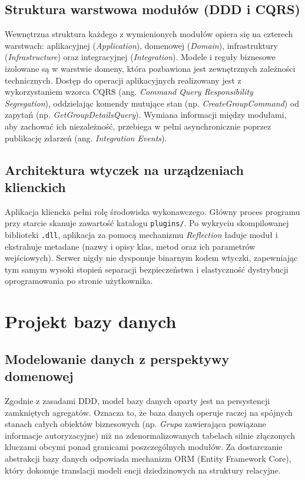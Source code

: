\subsection{Struktura warstwowa modułów (DDD i CQRS)}
\label{subsec:ddd_cqrs}
Wewnętrzna struktura każdego z wymienionych modułów opiera się na czterech warstwach: aplikacyjnej (\textit{Application}), domenowej (\textit{Domain}), infrastruktury (\textit{Infrastructure}) oraz integracyjnej (\textit{Integration}). Modele i reguły biznesowe izolowane są w warstwie domeny, która pozbawiona jest zewnętrznych zależności technicznych. Dostęp do operacji aplikacyjnych realizowany jest z wykorzystaniem wzorca CQRS (ang. \textit{Command Query Responsibility Segregation}), oddzielając komendy mutujące stan (np. \textit{CreateGroupCommand}) od zapytań (np. \textit{GetGroupDetailsQuery}). Wymiana informacji między modułami, aby zachować ich niezależność, przebiega w pełni asynchronicznie poprzez publikację zdarzeń (ang. \textit{Integration Events}).

\subsection{Architektura wtyczek na urządzeniach klienckich}
\label{subsec:architektura_wtyczek}
Aplikacja kliencka pełni rolę środowiska wykonawczego. Główny proces programu przy starcie skanuje zawartość katalogu \texttt{plugins/}. Po wykryciu skompilowanej biblioteki \texttt{.dll}, aplikacja za pomocą mechanizmu \textit{Reflection} ładuje moduł i ekstrahuje metadane (nazwy i opisy klas, metod oraz ich parametrów wejściowych). Serwer nigdy nie dysponuje binarnym kodem wtyczki, zapewniając tym samym wysoki stopień separacji bezpieczeństwa i elastyczność dystrybucji oprogramowania po stronie użytkownika.

\section{Projekt bazy danych}
\label{sec:baza_danych}

\subsection{Modelowanie danych z perspektywy domenowej}
\label{subsec:modelowanie_domenowe}
Zgodnie z zasadami DDD, model bazy danych oparty jest na persystencji zamkniętych agregatów. Oznacza to, że baza danych operuje raczej na spójnych stanach całych obiektów biznesowych (np. \textit{Grupa} zawierająca powiązane informacje autoryzacyjne) niż na zdenormalizowanych tabelach silnie złączonych kluczami obcymi ponad granicami poszczególnych modułów. Za dostarczanie abstrakcji bazy danych odpowiada mechanizm ORM (Entity Framework Core), który dokonuje translacji modeli encji dziedzinowych na struktury relacyjne.

